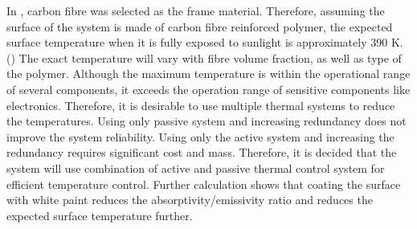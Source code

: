\documentclass[12pt, letterpaper]{article}
\begin{document}
In , carbon fibre was selected as the frame material. Therefore, assuming the surface of the system is made of carbon fibre reinforced polymer, the expected surface temperature when it is fully exposed to sunlight is approximately 390 K. () The exact temperature will vary with fibre volume fraction, as well as type of the polymer. Although the maximum temperature is within the operational range of several components, it exceeds the operation range of sensitive components like electronics. Therefore, it is desirable to use multiple thermal systems to reduce the temperatures. Using only passive system and increasing redundancy does not improve the system reliability. Using only the active system and increasing the redundancy requires significant cost and mass. Therefore, it is decided that the system will use combination of active and passive thermal control system for efficient temperature control. Further calculation shows that coating the surface with white paint reduces the absorptivity/emissivity ratio and reduces the expected surface temperature further.
\end{document}

